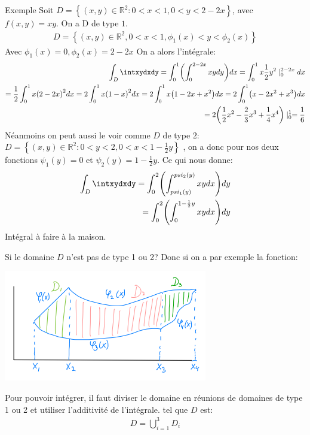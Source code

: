 \begin{parag}{Exemple}
    Soit $D =  \left\{\left(x, y\right) \in  \mathbb{R}^{2}: 0 < x < 1, 0 < y < 2-2x\right\}$, avec $f\left(x, y\right) =  xy$. On a D de type $1$.\\
    \begin{align*} 
        D =  \left\{\left(x, y\right) \in \mathbb{R}^{2}, 0 < x < 1, \phi_1\left(x\right)< y < \phi_2\left(x\right)\right\}
    \end{align*}
    Avec $\phi_1\left(x\right) =  0, \phi_2\left(x\right) =  2 - 2x$ On a alors l'intégrale:
    \begin{align*} 
        \int_D\intxydxdy =  \int_0^1\left(\int_0^{2-2x} xydy\right)dx =  \int_0^1x \frac{1}{2}y^2 \mid_{0}^{2-2x} dx\\
        = \frac{1}{2}\int_0^1x\left(2-2x\right)^2dx =  2 \int_0^1x\left(1-x\right)^2 dx =  2\int_0^1x\left(1-2x + x^2\right) dx =  2\int_0^1 \left(x-2x^2 + x^3\right) dx\\
        = 2\left(\frac{1}{2}x^2 - \frac{2}{3}x^3 + \frac{1}{4}x^4\right)\mid_0^1 =  \frac{1}{6}
    \end{align*}
    Néanmoins on peut aussi le voir comme $D$ de type $2$: $D = \left\{\left(x, y\right) \in \mathbb{R}^{2}: 0 < y < 2, 0 < x < 1 - \frac{1}{2}y\right\}$ , on a donc pour nos deux fonctions $\psi_1\left(y\right) = 0$ et $\psi_2\left(y\right) = 1 - \frac{1}{2}y$. Ce qui nous donne:
    \begin{align*} 
        \int_D \intxydxdy =  \int_0^2\left(\int_{psi_1\left(y\right)}^{psi_2\left(y\right)}xy dx\right) dy\\
        = \int_0^2\left(\int_0^{1 - \frac{1}{2}y}xydx\right)dy 
    \end{align*}
    Intégral à faire à la maison.
\end{parag}
\begin{parag}{Si le domaine $D$ n'est pas de type 1 ou 2?}
    Donc si on a par exemple la fonction:
    \begin{center}
        \includegraphics[scale=0.7]{32025-05-14.png}
    \end{center}
    
    Pour pouvoir intégrer, il faut diviser le domaine en réunions de domaines de type 1  ou 2 et utiliser l'additivité de l'intégrale. tel que $D$ est:
    \begin{align*} D =  \bigcup_{i =  1}^3 D_i \end{align*}
\end{parag}
